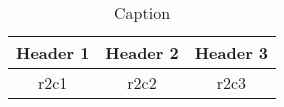 \begin{table}[htb!]
  \caption{Caption}
  \label{table:label}
  \centering
  \begin{tabular}{ccc}
    \toprule
    \textbf{Header 1} & \textbf{Header 2} & \textbf{Header 3}\\
    \midrule
                 r2c1 &              r2c2 &              r2c3\\
    \bottomrule
  \end{tabular}
\end{table}

